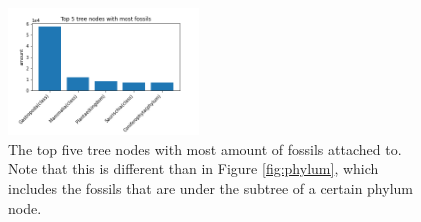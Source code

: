 \documentclass[11pt, a4paper,oneside,chapterprefix=false]{scrbook}
\begin{document}
\begin{figure}[h]
	\centering
	\includegraphics[width=0.45\textwidth]{figures/result/top_nodes}
	\caption{The top five tree nodes with most amount of fossils attached to. Note that this is different than in Figure \ref{fig:phylum}, which includes the fossils that are under the subtree of a certain phylum node.}
	\label{fig:top_nodes}
\end{figure}
\end{document}
